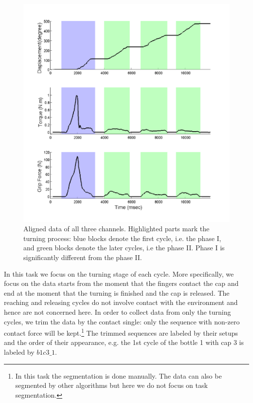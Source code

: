\begin{figure}
  \centering
  \hspace{-1cm}
  \includegraphics[width=14cm]{./fig_cha4/b3c2_1_sTF.pdf}
  \vspace{-0.5cm}
  \caption{ \scriptsize{Aligned data of all three channels. Highlighted parts mark the turning process: blue blocks denote the first cycle, i.e. the phase I, and green blocks denote the later cycles, i.e the phase II. Phase I is significantly different from the phase II.}
}
\label{fig:3channels}
\end{figure}

In this task we focus on the turning stage of each cycle. More specifically, we focus on the data starts from the moment that the fingers contact the cap and end at the moment that the turning is finished and the cap is released. The reaching and releasing cycles do not involve contact with the environment and hence are not concerned here.
In order to collect data from only the turning cycles, we trim the data by the contact single: only the sequence with non-zero contact force will be kept.\footnote{In this task the segmentation is done manually. The data can also be segmented by other algorithms but here we do not focus on task segmentation.} The trimmed sequences are labeled by their setups and the order of their appearance, e.g. the 1st cycle of the bottle 1 with cap 3 is labeled by $b1c3\_1$.

